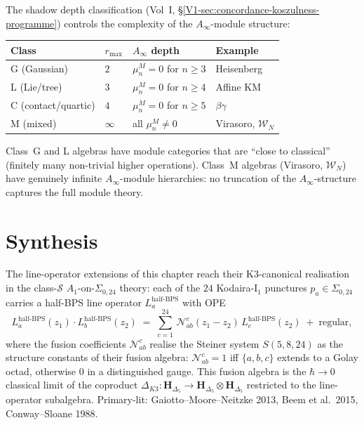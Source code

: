 \begin{remark}
The shadow depth classification
(Vol~I, \S\ref*{V1-sec:concordance-koszulness-programme})
controls the complexity of the $A_\infty$-module structure:
\begin{center}
\renewcommand{\arraystretch}{1.2}
\begin{tabular}{llll}
\textbf{Class} & $r_{\max}$
 & \textbf{$A_\infty$ depth}
 & \textbf{Example} \\
\hline
G (Gaussian) & $2$ & $\mu_n^M=0$ for $n\ge 3$
 & Heisenberg \\
L (Lie/tree) & $3$ & $\mu_n^M=0$ for $n\ge 4$
 & Affine KM \\
C (contact/quartic) & $4$ & $\mu_n^M=0$ for $n\ge 5$
 & $\beta\gamma$ \\
M (mixed) & $\infty$ & all $\mu_n^M\ne 0$
 & Virasoro, $\mathcal{W}_N$
\end{tabular}
\end{center}
Class~G and L algebras have module categories
that are ``close to classical'' (finitely many non-trivial
higher operations). Class~M algebras (Virasoro,
$\mathcal{W}_N$) have genuinely infinite $A_\infty$-module
hierarchies: no truncation of the $A_\infty$-structure
captures the full module theory.
\end{remark}

\section{Synthesis}
\label{sec:lineop-ext-supplement}

\begin{remark}
\label{rem:lineop-ext-1}
The line-operator extensions of this chapter reach their K3-canonical
realisation in the class-$\mathcal S$ $A_1$-on-$\Sigma_{0,24}$
theory: each of the $24$ Kodaira-I$_1$ punctures $p_a\in\Sigma_{0,24}$
carries a half-BPS line operator $L_a^{\mathrm{half\text{-}BPS}}$ with
OPE
\[
L_a^{\mathrm{half\text{-}BPS}}(z_1)\cdot L_b^{\mathrm{half\text{-}BPS}}(z_2) \;=\; \sum_{c=1}^{24}\, \mathcal N^c_{ab}(z_1-z_2)\, L_c^{\mathrm{half\text{-}BPS}}(z_2) \;+\; \text{regular},
\]
where the fusion coefficients $\mathcal N^c_{ab}$ realise the
Steiner system $S(5,8,24)$ as the structure constants of their fusion
algebra: $\mathcal N^c_{ab} = 1$ iff $\{a,b,c\}$ extends to a Golay
octad, otherwise $0$ in a distinguished gauge. This fusion algebra is
the $\hbar\to 0$ classical limit of the coproduct
$\Delta_{K3}:\mathbf H_{\Delta_5}\to\mathbf H_{\Delta_5}\otimes\mathbf H_{\Delta_5}$
restricted to the line-operator subalgebra. Primary-lit: Gaiotto--Moore--Neitzke
2013, Beem et al.\ 2015, Conway--Sloane 1988.
\end{remark}
